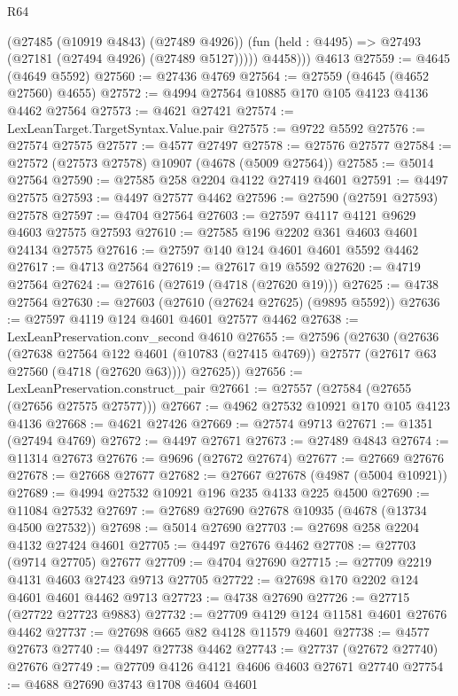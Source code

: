 \begin{lexlean}{R64}
\begin{coremodule}
            (@27485 (@10919 @4843) (@27489 @4926))
            (fun (held : @4495) => @27493 (@27181 (@27494 @4926) (@27489 @5127)))))
          @4458)))
    @4613
@27559 := @4645 (@4649 @5592)
@27560 := @27436 @4769
@27564 := @27559 (@4645 (@4652 @27560) @4655)
@27572 := @4994 @27564 @10885 @170 @105 @4123 @4136 @4462 @27564
@27573 := @4621 @27421
@27574 := LexLeanTarget.TargetSyntax.Value.pair
@27575 := @9722 @5592
@27576 := @27574 @27575
@27577 := @4577 @27497
@27578 := @27576 @27577
@27584 := @27572 (@27573 @27578) @10907 (@4678 (@5009 @27564))
@27585 := @5014 @27564
@27590 := @27585 @258 @2204 @4122 @27419 @4601
@27591 := @4497 @27575
@27593 := @4497 @27577 @4462
@27596 := @27590 (@27591 @27593) @27578
@27597 := @4704 @27564
@27603 := @27597 @4117 @4121 @9629 @4603 @27575 @27593
@27610 := @27585 @196 @2202 @361 @4603 @4601 @24134 @27575
@27616 := @27597 @140 @124 @4601 @4601 @5592 @4462
@27617 := @4713 @27564
@27619 := @27617 @19 @5592
@27620 := @4719 @27564
@27624 := @27616 (@27619 (@4718 (@27620 @19)))
@27625 := @4738 @27564
@27630 := @27603 (@27610 (@27624 @27625) (@9895 @5592))
@27636 := @27597 @4119 @124 @4601 @4601 @27577 @4462
@27638 := LexLeanPreservation.conv_second @4610
@27655 := @27596
    (@27630
      (@27636
        (@27638
          @27564
          @122
          @4601
          (@10783 (@27415 @4769))
          @27577
          (@27617 @63 @27560 (@4718 (@27620 @63))))
        @27625))
@27656 := LexLeanPreservation.construct_pair
@27661 := @27557 (@27584 (@27655 (@27656 @27575 @27577)))
@27667 := @4962 @27532 @10921 @170 @105 @4123 @4136
@27668 := @4621 @27426
@27669 := @27574 @9713
@27671 := @1351 (@27494 @4769)
@27672 := @4497 @27671
@27673 := @27489 @4843
@27674 := @11314 @27673
@27676 := @9696 (@27672 @27674)
@27677 := @27669 @27676
@27678 := @27668 @27677
@27682 := @27667 @27678 (@4987 (@5004 @10921))
@27689 := @4994 @27532 @10921 @196 @235 @4133 @225 @4500
@27690 := @11084 @27532
@27697 := @27689 @27690 @27678 @10935 (@4678 (@13734 @4500 @27532))
@27698 := @5014 @27690
@27703 := @27698 @258 @2204 @4132 @27424 @4601
@27705 := @4497 @27676 @4462
@27708 := @27703 (@9714 @27705) @27677
@27709 := @4704 @27690
@27715 := @27709 @2219 @4131 @4603 @27423 @9713 @27705
@27722 := @27698 @170 @2202 @124 @4601 @4601 @4462 @9713
@27723 := @4738 @27690
@27726 := @27715 (@27722 @27723 @9883)
@27732 := @27709 @4129 @124 @11581 @4601 @27676 @4462
@27737 := @27698 @665 @82 @4128 @11579 @4601
@27738 := @4577 @27673
@27740 := @4497 @27738 @4462
@27743 := @27737 (@27672 @27740) @27676
@27749 := @27709 @4126 @4121 @4606 @4603 @27671 @27740
@27754 := @4688 @27690 @3743 @1708 @4604 @4601

\end{coremodule}
\end{lexlean}
